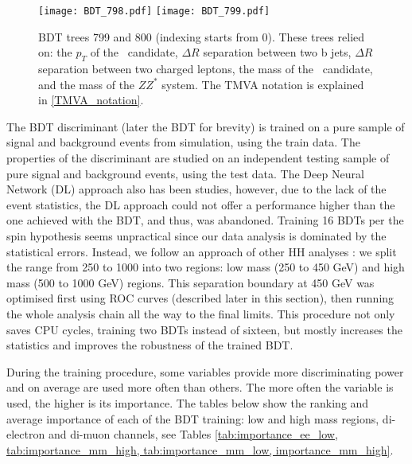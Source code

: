 \begin{figure}[H]
  \begin{center}
    \texttt{[image: BDT\_798.pdf]}
    \texttt{[image: BDT\_799.pdf]}\\
     \caption[BDT trees 799 and 800.]{BDT trees 799 and 800 (indexing starts from 0). These trees relied on: the $p_T$ of the \Zll~candidate, 
     $\Delta R$ separation between two b jets,
     $\Delta R$ separation between two charged leptons, 
      the mass of the \HBB~candidate, and the mass of the $ZZ^*$ system. The TMVA notation is explained in \ref{TMVA_notation}.}       
     \label{fig:bdt_trees_3}
  \end{center}
\end{figure}
           
The BDT discriminant (later the BDT for brevity) is trained on a pure sample of signal and background events from simulation, using the train data. The  properties of the discriminant are studied on an independent testing sample of pure signal and background events, using the test data. The Deep Neural Network (DL) approach also has been studies, however, due to the lack of the event statistics, the DL approach could not offer a performance higher than the one achieved with the BDT, and thus, was abandoned. Training 16 BDTs per the spin hypothesis seems unpractical since our data analysis is dominated by the statistical errors. Instead, we follow an approach of other HH analyses \cite{HH_combination}: we split the range from 250 to 1000 into two regions: low mass (250 to 450 GeV) and high mass (500 to 1000 GeV) regions. This separation boundary at 450 GeV was optimised first using ROC curves (described later in this section), then running the whole analysis chain all the way to the final limits. This procedure not only saves CPU cycles, training two BDTs instead of sixteen, but mostly increases the statistics and improves the robustness of the trained BDT. 
           
During the training procedure, some variables provide more discriminating power and on average are used more often than others. The more often the variable is used, the higher is its importance. The tables below show the ranking and average importance of each of the BDT training: low and high mass regions, di-electron and di-muon channels, see Tables \ref{tab:importance_ee_low, tab:importance_mm_high, tab:importance_mm_low, importance_mm_high}. 

